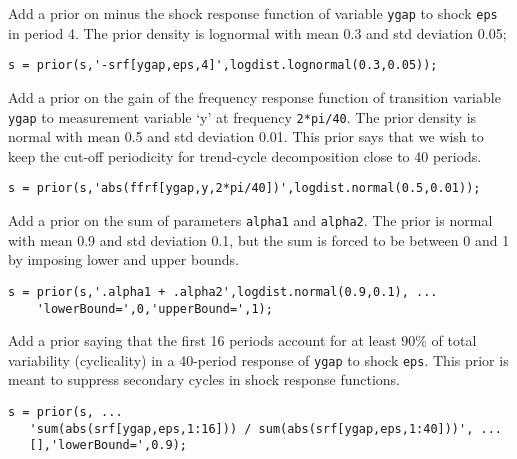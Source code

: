 Add a prior on minus the shock response function of variable
\texttt{ygap} to shock \texttt{eps} in period 4. The prior density is
lognormal with mean 0.3 and std deviation 0.05;

\begin{verbatim}
s = prior(s,'-srf[ygap,eps,4]',logdist.lognormal(0.3,0.05));
\end{verbatim}

Add a prior on the gain of the frequency response function of transition
variable \texttt{ygap} to measurement variable `y' at frequency
\texttt{2*pi/40}. The prior density is normal with mean 0.5 and std
deviation 0.01. This prior says that we wish to keep the cut-off
periodicity for trend-cycle decomposition close to 40 periods.

\begin{verbatim}
s = prior(s,'abs(ffrf[ygap,y,2*pi/40])',logdist.normal(0.5,0.01));
\end{verbatim}

Add a prior on the sum of parameters \texttt{alpha1} and
\texttt{alpha2}. The prior is normal with mean 0.9 and std deviation
0.1, but the sum is forced to be between 0 and 1 by imposing lower and
upper bounds.

\begin{verbatim}
s = prior(s,'.alpha1 + .alpha2',logdist.normal(0.9,0.1), ...
    'lowerBound=',0,'upperBound=',1);
\end{verbatim}

Add a prior saying that the first 16 periods account for at least 90\%
of total variability (cyclicality) in a 40-period response of
\texttt{ygap} to shock \texttt{eps}. This prior is meant to suppress
secondary cycles in shock response functions.

\begin{verbatim}
s = prior(s, ...
   'sum(abs(srf[ygap,eps,1:16])) / sum(abs(srf[ygap,eps,1:40]))', ...
   [],'lowerBound=',0.9);
\end{verbatim}


